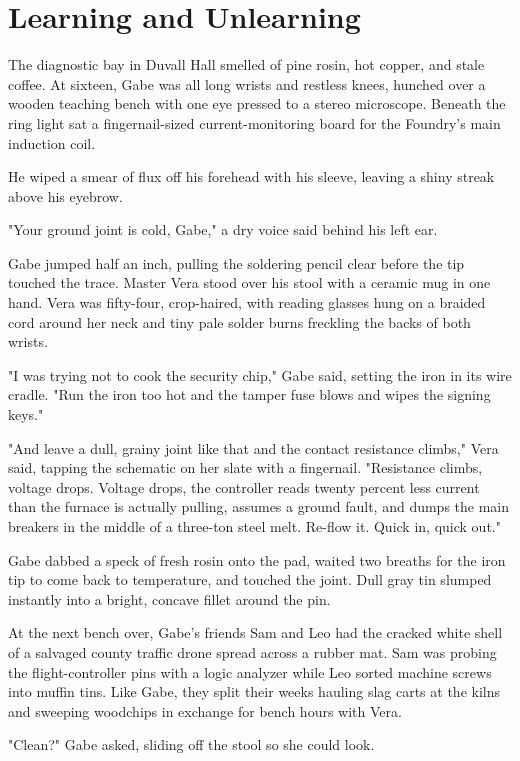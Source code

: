 \chapter{Learning and Unlearning}

The diagnostic bay in Duvall Hall smelled of pine rosin, hot copper, and stale coffee. At sixteen, Gabe was all long wrists and restless knees, hunched over a wooden teaching bench with one eye pressed to a stereo microscope. Beneath the ring light sat a fingernail-sized current-monitoring board for the Foundry's main induction coil.

He wiped a smear of flux off his forehead with his sleeve, leaving a shiny streak above his eyebrow.

"Your ground joint is cold, Gabe," a dry voice said behind his left ear.

Gabe jumped half an inch, pulling the soldering pencil clear before the tip touched the trace. Master Vera stood over his stool with a ceramic mug in one hand. Vera was fifty-four, crop-haired, with reading glasses hung on a braided cord around her neck and tiny pale solder burns freckling the backs of both wrists.

"I was trying not to cook the security chip," Gabe said, setting the iron in its wire cradle. "Run the iron too hot and the tamper fuse blows and wipes the signing keys."

"And leave a dull, grainy joint like that and the contact resistance climbs," Vera said, tapping the schematic on her slate with a fingernail. "Resistance climbs, voltage drops. Voltage drops, the controller reads twenty percent less current than the furnace is actually pulling, assumes a ground fault, and dumps the main breakers in the middle of a three-ton steel melt. Re-flow it. Quick in, quick out."

Gabe dabbed a speck of fresh rosin onto the pad, waited two breaths for the iron tip to come back to temperature, and touched the joint. Dull gray tin slumped instantly into a bright, concave fillet around the pin.

At the next bench over, Gabe's friends Sam and Leo had the cracked white shell of a salvaged county traffic drone spread across a rubber mat. Sam was probing the flight-controller pins with a logic analyzer while Leo sorted machine screws into muffin tins. Like Gabe, they split their weeks hauling slag carts at the kilns and sweeping woodchips in exchange for bench hours with Vera.

"Clean?" Gabe asked, sliding off the stool so she could look.

